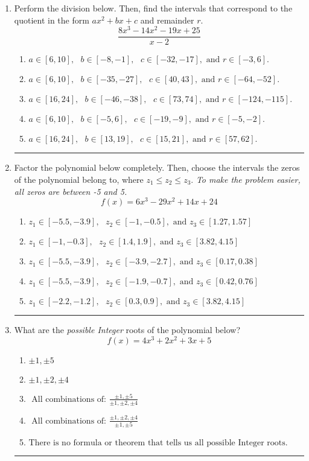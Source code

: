 \documentclass[14pt]{extbook}
\newcommand{\litem}[1]{\item#1\hspace*{-1cm}\rule{\textwidth}{0.4pt}}
\begin{document}
\begin{enumerate}
{\begin{enumerate}[label=\Alph*.]
\end{enumerate} }
\litem{
Perform the division below. Then, find the intervals that correspond to the quotient in the form $ax^2+bx+c$ and remainder $r$.\[ \frac{8x^{3} -14 x^{2} -19 x + 25}{x -2} \]\begin{enumerate}[label=\Alph*.]
\item \( a \in [6, 10], \text{   } b \in [-8, -1], \text{   } c \in [-32, -17], \text{   and   } r \in [-3, 6]. \)
\item \( a \in [6, 10], \text{   } b \in [-35, -27], \text{   } c \in [40, 43], \text{   and   } r \in [-64, -52]. \)
\item \( a \in [16, 24], \text{   } b \in [-46, -38], \text{   } c \in [73, 74], \text{   and   } r \in [-124, -115]. \)
\item \( a \in [6, 10], \text{   } b \in [-5, 6], \text{   } c \in [-19, -9], \text{   and   } r \in [-5, -2]. \)
\item \( a \in [16, 24], \text{   } b \in [13, 19], \text{   } c \in [15, 21], \text{   and   } r \in [57, 62]. \)

\end{enumerate} }
\litem{
Factor the polynomial below completely. Then, choose the intervals the zeros of the polynomial belong to, where $z_1 \leq z_2 \leq z_3$. \textit{To make the problem easier, all zeros are between -5 and 5.}\[ f(x) = 6x^{3} -29 x^{2} +14 x + 24 \]\begin{enumerate}[label=\Alph*.]
\item \( z_1 \in [-5.5, -3.9], \text{   }  z_2 \in [-1, -0.5], \text{   and   } z_3 \in [1.27, 1.57] \)
\item \( z_1 \in [-1, -0.3], \text{   }  z_2 \in [1.4, 1.9], \text{   and   } z_3 \in [3.82, 4.15] \)
\item \( z_1 \in [-5.5, -3.9], \text{   }  z_2 \in [-3.9, -2.7], \text{   and   } z_3 \in [0.17, 0.38] \)
\item \( z_1 \in [-5.5, -3.9], \text{   }  z_2 \in [-1.9, -0.7], \text{   and   } z_3 \in [0.42, 0.76] \)
\item \( z_1 \in [-2.2, -1.2], \text{   }  z_2 \in [0.3, 0.9], \text{   and   } z_3 \in [3.82, 4.15] \)

\end{enumerate} }
\litem{
What are the \textit{possible Integer} roots of the polynomial below?\[ f(x) = 4x^{3} +2 x^{2} +3 x + 5 \]\begin{enumerate}[label=\Alph*.]
\item \( \pm 1,\pm 5 \)
\item \( \pm 1,\pm 2,\pm 4 \)
\item \( \text{ All combinations of: }\frac{\pm 1,\pm 5}{\pm 1,\pm 2,\pm 4} \)
\item \( \text{ All combinations of: }\frac{\pm 1,\pm 2,\pm 4}{\pm 1,\pm 5} \)
\item \( \text{There is no formula or theorem that tells us all possible Integer roots.} \)


\end{enumerate}}
\end{enumerate}
\end{document}
